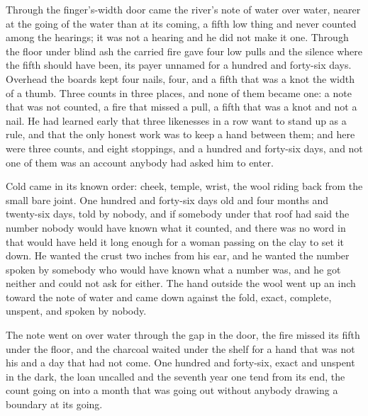 \scenebreak

Through the finger's-width door came the river's note of water over water, nearer at the going of the water than at its coming, a fifth low thing and never counted among the hearings; it was not a hearing and he did not make it one. Through the floor under blind ash the carried fire gave four low pulls and the silence where the fifth should have been, its payer unnamed for a hundred and forty-six days. Overhead the boards kept four nails, four, and a fifth that was a knot the width of a thumb. Three counts in three places, and none of them became one: a note that was not counted, a fire that missed a pull, a fifth that was a knot and not a nail. He had learned early that three likenesses in a row want to stand up as a rule, and that the only honest work was to keep a hand between them; and here were three counts, and eight stoppings, and a hundred and forty-six days, and not one of them was an account anybody had asked him to enter.

Cold came in its known order: cheek, temple, wrist, the wool riding back from the small bare joint. One hundred and forty-six days old and four months and twenty-six days, told by nobody, and if somebody under that roof had said the number nobody would have known what it counted, and there was no word in  that would have held it long enough for a woman passing on the clay to set it down. He wanted the crust two inches from his ear, and he wanted the number spoken by somebody who would have known what a number was, and he got neither and could not ask for either. The hand outside the wool went up an inch toward the note of water and came down against the fold, exact, complete, unspent, and spoken by nobody.

The note went on over water through the gap in the door, the fire missed its fifth under the floor, and the charcoal waited under the shelf for a hand that was not his and a day that had not come. One hundred and forty-six, exact and unspent in the dark, the loan uncalled and the seventh year one tend from its end, the count going on into a month that was going out without anybody drawing a boundary at its going.
